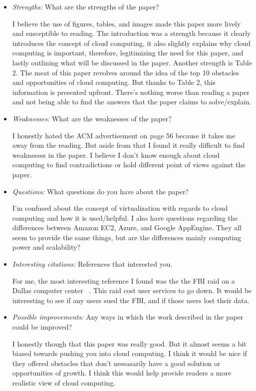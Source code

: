 \documentclass[letterpaper,twocolumn,10pt]{article}
\begin{document}
\begin{itemize}

\item {\it Strengths:} What are the strengths of the paper? 

I believe the use of figures, tables, and images made this paper more lively and susceptible to reading. 
The introduction was a strength because it clearly introduces the concept of cloud computing, it also slightly 
explains why cloud computing is important, therefore, legitimizing the need for this paper, and lastly outlining
what will be discussed in the paper. Another strength is Table 2. The meat of this paper revolves around the 
idea of the top 10 obstacles and opportunities of cloud computing. But thanks to Table 2, this information is presented
upfront. There's nothing worse than reading a paper and not being able to find the answers that the paper claims to solve/explain.

\item {\it Weaknesses:} What are the weaknesses of the paper? 

I honestly hated the ACM advertisement on page 56 because it takes me away from the reading. But aside from that
I found it really difficult to find weaknesses in the paper. I believe I don't know enough about cloud computing to find
contradictions or hold different point of views against the paper. 

\item {\it Questions:} What questions do you have about the paper? 

I'm confused about the concept of virtualization with regards to cloud computing and how it is used/helpful.
I also have questions regarding the differences between Amazon EC2, Azure, and Google AppEngine. They
all seem to provide the same things, but are the differences mainly computing power and scalability? 

\item {\it Interesting citations:} References that interested you.

For me, the most interesting reference I found was the the FBI raid on a Dallas computer center ~\cite{fbi}.
This raid cost user services to go down. It would be interesting to see if any users sued the FBI, and if those
users lost their data.

\item {\it Possible improvements:} Any ways in which the work described in
the paper could be improved? 

I honestly though that this paper was really good. But it almost seems a bit biased towards pushing you into
cloud computing. I think it would be nice if they offered obstacles that don't nessasarily have a good solution or 
opportunities of growth. I think this would help provide readers a more realistic view of cloud computing. 


\end{itemize}
\end{document}
